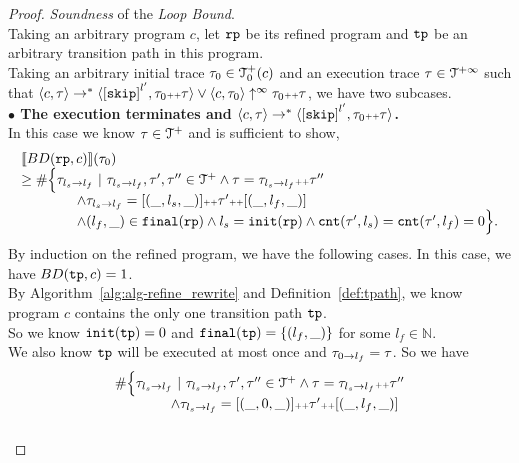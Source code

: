 \begin{proof}
\emph{Soundness} of the \emph{Loop Bound}.
  \\
  Taking an arbitrary program $c$, let $\mathtt{rp}$ be its refined program and $\mathtt{tp}$ be an arbitrary transition path in this program.
  \\
Taking an arbitrary initial trace $\mathtt{\tau}_0 \in \mathcal{T}^{+}_0(c)$  and an execution trace $\mathtt{\tau} \in \mathcal{T}^{+\infty}$
 such that $\config{{c}, \trace} \to^{*} \config{\clabel{\eskip}^{l'}, \trace_0 \tracecat \vtrace} \lor \config{c, \trace_0} \uparrow^{\infty} \trace_0 \tracecat \trace$,
 we have two subcases.
\\
\textbf{$\bullet$ The execution terminates and {$\config{{c}, \trace} \to^{*} \config{\clabel{\eskip}^{l'}, \trace_0 \tracecat \vtrace}$}.} 
\\
 In this case we know $\mathtt{\tau} \in \mathcal{T}^{+}$ and is sufficient to show,
 \[
  \begin{array}{l}
  \llbracket BD(\mathtt{rp}, c) \rrbracket(\mathtt{\tau}_0) 
  \\ \geq
  \# \Big\{\mathtt{\tau}_{l_s \to l_f} ~\vert~ \mathtt{\tau}_{l_s \to l_f}, \mathtt{\tau}', \mathtt{\tau}''\in \mathcal{T}^{+}
  \land \mathtt{\tau} = \mathtt{\tau}_{l_s \to l_f} {\scriptscriptstyle ++} \mathtt{\tau}''
  \\ \qquad \qquad
  \land \mathtt{\tau}_{l_s \to l_f} = [(\_, l_s, \_)] {\scriptscriptstyle ++} \mathtt{\tau}' {\scriptscriptstyle ++} [(\_, l_f, \_)]
  \\ \qquad \qquad
  \land (l_{f}, \_) \in \mathtt{final}(\mathtt{rp})
  \land l_s = \mathtt{init}(\mathtt{rp})
  \land \mathtt{cnt}(\mathtt{\tau}', l_s) = \mathtt{cnt}(\mathtt{\tau}', l_f) = 0 
  \Big\}.
\end{array}
\]
By induction on the refined program, we have the following cases.
\caseL{$\rprog = \tpath$}
In this case, we have $BD(\mathtt{tp}, c) = 1$.
\\
By Algorithm~\ref{alg:alg-refine_rewrite} and Definition~\ref{def:tpath}, we know program $c$ contains the only one transition path $\mathtt{tp}$.
\\
So we know $\mathtt{init}(\mathtt{tp}) = 0$ and $\mathtt{final}(\mathtt{tp}) = \{ (l_f, \_) \}$ for some $l_f \in \mathbb{N}$.
\\
We also know $\mathtt{tp}$ will be executed at most once and $\mathtt{\tau}_{0 \to l_f} = \mathtt{\tau}$. So we have
\[
  \begin{array}{l}
    \# \Big\{\mathtt{\tau}_{l_s \to l_f} ~\vert~ \mathtt{\tau}_{l_s \to l_f}, \mathtt{\tau}', \mathtt{\tau}''\in \mathcal{T}^{+}
    \land \mathtt{\tau} = \mathtt{\tau}_{l_s \to l_f} {\scriptscriptstyle ++} \mathtt{\tau}''
    \\ \qquad \qquad
    \land \mathtt{\tau}_{l_s \to l_f} = [(\_, 0, \_)] {\scriptscriptstyle ++} \mathtt{\tau}' {\scriptscriptstyle ++} [(\_, l_f, \_)]
    \\ \qquad \qquad

\end{array}\]
\end{proof}
